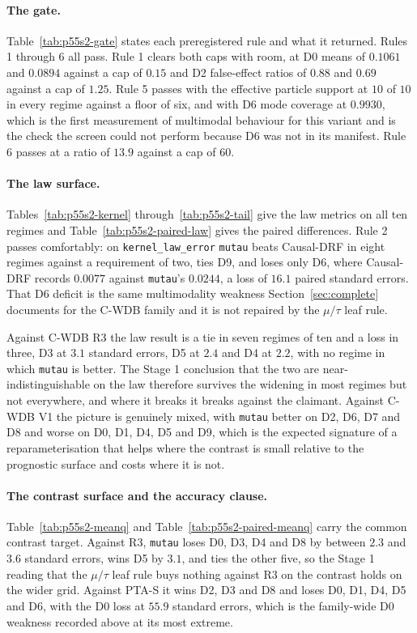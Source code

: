 \paragraph{The gate.} Table~\ref{tab:p55s2-gate} states each preregistered rule
and what it returned. Rules 1 through 6 all pass. Rule 1 clears both caps with
room, at D0 means of $0.1061$ and $0.0894$ against a cap of $0.15$ and D2
false-effect ratios of $0.88$ and $0.69$ against a cap of $1.25$. Rule 5 passes
with the effective particle support at $10$ of $10$ in every regime against a
floor of six, and with D6 mode coverage at $0.9930$, which is the first
measurement of multimodal behaviour for this variant and is the check the screen
could not perform because D6 was not in its manifest. Rule 6 passes at a ratio
of $13.9$ against a cap of $60$.

\paragraph{The law surface.} Tables~\ref{tab:p55s2-kernel}
through~\ref{tab:p55s2-tail} give the law metrics on all ten regimes and
Table~\ref{tab:p55s2-paired-law} gives the paired differences. Rule 2 passes
comfortably: on \texttt{kernel\_law\_error} \texttt{mutau} beats Causal-DRF in
eight regimes against a requirement of two, ties D9, and loses only D6, where
Causal-DRF records $0.0077$ against \texttt{mutau}'s $0.0244$, a loss of $16.1$
paired standard errors. That D6 deficit is the same multimodality weakness
Section~\ref{sec:complete} documents for the C-WDB family and it is not repaired
by the $\mu/\tau$ leaf rule.

Against C-WDB R3 the law result is a tie in seven regimes of ten and a loss in
three, D3 at $3.1$ standard errors, D5 at $2.4$ and D4 at $2.2$, with no regime
in which \texttt{mutau} is better. The Stage 1 conclusion that the two are
near-indistinguishable on the law therefore survives the widening in most
regimes but not everywhere, and where it breaks it breaks against the claimant.
Against C-WDB V1 the picture is genuinely mixed, with \texttt{mutau} better on
D2, D6, D7 and D8 and worse on D0, D1, D4, D5 and D9, which is the expected
signature of a reparameterisation that helps where the contrast is small
relative to the prognostic surface and costs where it is not.

\paragraph{The contrast surface and the accuracy clause.}
Table~\ref{tab:p55s2-meanq} and Table~\ref{tab:p55s2-paired-meanq} carry the
common contrast target. Against R3, \texttt{mutau} loses D0, D3, D4 and D8 by
between $2.3$ and $3.6$ standard errors, wins D5 by $3.1$, and ties the other
five, so the Stage 1 reading that the $\mu/\tau$ leaf rule buys nothing against
R3 on the contrast holds on the wider grid. Against PTA-S it wins D2, D3 and D8
and loses D0, D1, D4, D5 and D6, with the D0 loss at $55.9$ standard errors,
which is the family-wide D0 weakness recorded above at its most extreme.

